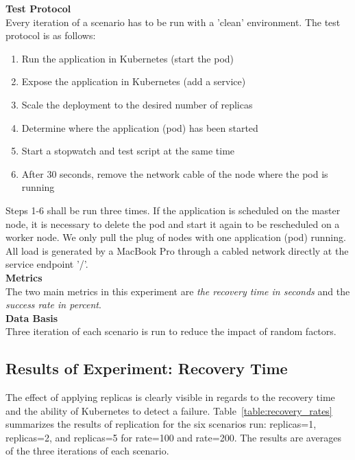 \noindent\textbf{Test Protocol}\\
Every iteration of a scenario has to be run with a 'clean' environment. The test protocol is as follows:
\begin{enumerate}
  \item Run the application in Kubernetes (start the pod)
  \item Expose the application in Kubernetes (add a service)
  \item Scale the deployment to the desired number of replicas
  \item Determine where the application (pod) has been started
  \item Start a stopwatch and test script at the same time
  \item After 30 seconds, remove the network cable of the node where the pod is running
\end{enumerate}
\noindent Steps 1-6 shall be run three times. If the application is scheduled on the master node, it is necessary to delete the pod and start it again to be rescheduled on a worker node. We only pull the plug of nodes with one application (pod) running. All load is generated by a MacBook Pro through a cabled network directly at the service endpoint '/'. \\

\noindent\textbf{Metrics}\\
The two main metrics in this experiment are \textit{the recovery time in seconds} and the \textit{success rate in percent}.\\

\noindent\textbf{Data Basis}\\
Three iteration of each scenario is run to reduce the impact of random factors.

\subsection*{Results of Experiment: Recovery Time}

The effect of applying replicas is clearly visible in regards to the recovery time and the ability of Kubernetes to detect a failure. Table~\ref{table:recovery_rates} summarizes the results of replication for the six scenarios run: replicas=1, replicas=2, and replicas=5 for rate=100 and rate=200. The results are averages of the three iterations of each scenario. 


